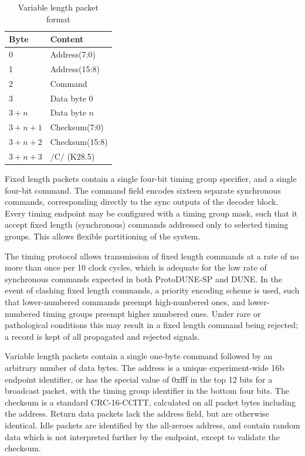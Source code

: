 \documentclass[a4paper,11pt]{article}
\begin{document}
\begin{table}[h!]
  \centering
  \begin{tabular}{@{}ll@{}} \toprule
    Byte & Content \\ \midrule
    0 & Address(7:0) \\
    1 & Address(15:8) \\
    2 & Command \\
    3 & Data byte 0 \\ 
    $3 + n$ & Data byte $n$ \\ 
    $3 + n + 1$ & Checksum(7:0) \\
    $3 + n + 2$ & Checksum(15:8) \\
    $3 + n + 3$ & /C/ (K28.5) \\ \bottomrule
  \end{tabular}
  \caption{Variable length packet format}
  \label{tab:async}
\end{table}

Fixed length packets contain a single four-bit timing group specifier, and a single four-bit command. The command field encodes sixteen separate synchronous commands, corresponding directly to the sync outputs of the decoder block. Every timing endpoint may be configured with a timing group mask, such that it accept fixed length (synchronous) commands addressed only to selected timing groups. This allows flexible partitioning of the system.

The timing protocol allows transmission of fixed length commands at a rate of no more than once per 10 clock cycles, which is adequate for the low rate of synchronous commands expected in both ProtoDUNE-SP and DUNE. In the event of clashing fixed length commands, a priority encoding scheme is used, such that lower-numbered commands preempt high-numbered ones, and lower-numbered timing groups preempt higher numbered ones. Under rare or pathological conditions this may result in a fixed length command being rejected; a record is kept of all propagated and rejected signals.

Variable length packets contain a single one-byte command followed by an arbitrary number of data bytes. The address is a unique experiment-wide 16b endpoint identifier, or has the special value of 0xfff in the top 12 bits for a broadcast packet, with the timing group identifier in the bottom four bits. The checksum is a standard CRC-16-CCITT, calculated on all packet bytes including the address. Return data packets lack the address field, but are otherwise identical. Idle packets are identified by the all-zeroes address, and contain random data which is not interpreted further by the endpoint, except to validate the checksum.
\end{document}
